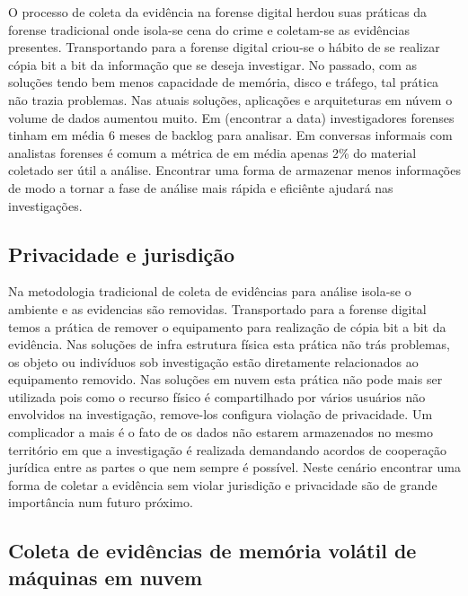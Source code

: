O processo de coleta da evidência na forense digital herdou suas práticas da forense tradicional onde isola-se cena do crime e coletam-se as evidências presentes. 
%
Transportando para a forense digital criou-se o hábito de se realizar cópia bit a bit da informação que se deseja investigar. 
%
No passado, com as soluções tendo bem menos capacidade de memória, disco e tráfego, tal prática não trazia problemas. Nas atuais soluções, aplicações e arquiteturas em núvem o volume de dados aumentou  muito.
%
Em (encontrar a data) investigadores forenses tinham em média 6 meses de backlog para analisar. Em conversas informais com analistas forenses é comum a métrica de em média apenas 2\% do material coletado ser útil a análise.
%
Encontrar uma forma de armazenar menos informações de modo a tornar a fase de análise mais rápida e eficiênte ajudará nas investigações.

\subsection{Privacidade e jurisdição}
\label{sec:violacaoprivacidadejuriscdicao}

Na metodologia tradicional de coleta de evidências para análise isola-se o ambiente e as evidencias são removidas. Transportado para a forense digital temos a prática de remover o equipamento para realização de cópia bit a bit da evidência.
%
Nas soluções de infra estrutura física esta prática não trás problemas, os objeto ou indivíduos sob investigação estão diretamente relacionados ao equipamento removido. 
%
Nas soluções em nuvem esta prática não pode mais ser utilizada pois como o recurso físico é compartilhado por vários usuários não envolvidos na investigação, remove-los configura violação de privacidade.
%
Um complicador a mais é o fato de os dados não estarem armazenados no mesmo território em que a investigação é realizada demandando acordos de cooperação jurídica entre as partes o que nem sempre é possível.
%
Neste cenário encontrar uma forma de coletar a evidência sem violar jurisdição e privacidade são de grande importância num futuro próximo.


\subsection{Coleta de evidências de memória volátil de máquinas em nuvem}
\label{sec:forensenuvem}


